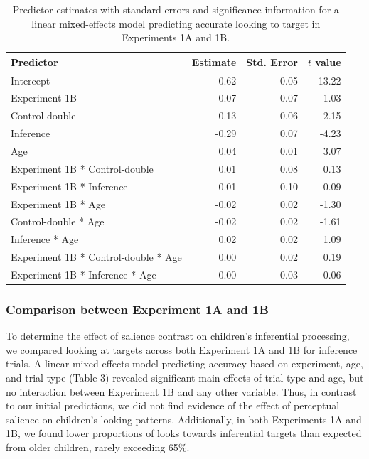 \documentclass[a4paper,man,apacite,floatsintext]{apa6}
\begin{document}
\begin{table}[tb]
\centering
\begin{tabular}{lrrr}
 Predictor & Estimate & Std. Error & $t$ value \\ 
  \hline
Intercept & 0.62 & 0.05 & 13.22 \\ 
  Experiment 1B & 0.07 & 0.07 & 1.03 \\ 
  Control-double & 0.13 & 0.06 & 2.15 \\ 
  Inference & -0.29 & 0.07 & -4.23 \\ 
  Age & 0.04 & 0.01 & 3.07 \\ 
  Experiment 1B * Control-double & 0.01 & 0.08 & 0.13 \\ 
  Experiment 1B * Inference & 0.01 & 0.10 & 0.09 \\ 
  Experiment 1B * Age & -0.02 & 0.02 & -1.30 \\ 
  Control-double * Age & -0.02 & 0.02 & -1.61 \\ 
  Inference * Age & 0.02 & 0.02 & 1.09 \\ 
  Experiment 1B * Control-double * Age & 0.00 & 0.02 & 0.19 \\ 
  Experiment 1B * Inference * Age & 0.00 & 0.03 & 0.06 \\ 
   \hline
\end{tabular}
\caption{Predictor estimates with standard errors and significance information for a linear mixed-effects model predicting accurate looking to target in Experiments 1A and 1B.} 
\label{tab:exp2_tab}
\end{table}

\subsubsection{Comparison between Experiment 1A and
1B}\label{comparison-between-experiment-1a-and-1b}

To determine the effect of salience contrast on children's inferential
processing, we compared looking at targets across both Experiment 1A and
1B for inference trials. A linear mixed-effects model predicting
accuracy based on experiment, age, and trial type (Table 3) revealed
significant main effects of trial type and age, but no interaction
between Experiment 1B and any other variable. Thus, in contrast to our
initial predictions, we did not find evidence of the effect of
perceptual salience on children's looking patterns. Additionally, in
both Experiments 1A and 1B, we found lower proportions of looks towards
inferential targets than expected from older children, rarely exceeding
65\%.
\end{document}
